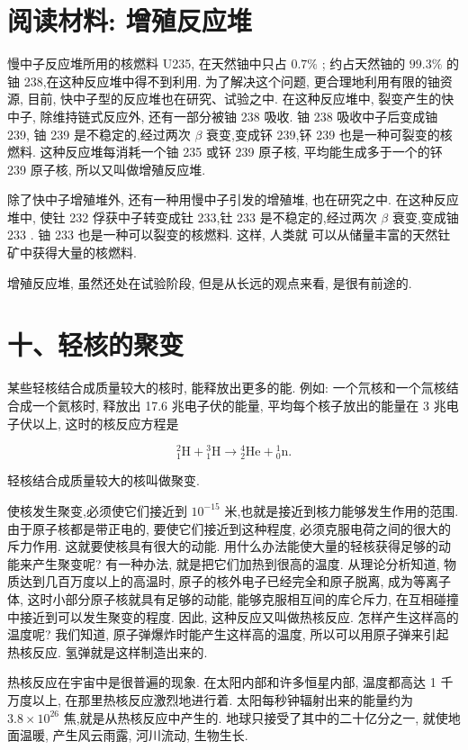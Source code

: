 \documentclass[10pt]{article}
\begin{document}
\section*{阅读材料: 增殖反应堆}

慢中子反应堆所用的核燃料 U235, 在天然铀中只占 \({0.7}\%\) ; 约占天然铀的 \({99.3}\%\) 的铀 238,在这种反应堆中得不到利用. 为了解决这个问题, 更合理地利用有限的铀资源, 目前, 快中子型的反应堆也在研究、试验之中. 在这种反应堆中, 裂变产生的快中子, 除维持链式反应外, 还有一部分被铀 238 吸收. 铀 238 吸收中子后变成铀 239, 铀 239 是不稳定的,经过两次 \(\beta\) 衰变,变成钚 239,钚 239 也是一种可裂变的核燃料. 这种反应堆每消耗一个铀 235 或钚 239 原子核, 平均能生成多于一个的钚 239 原子核, 所以又叫做增殖反应堆.

除了快中子增殖堆外, 还有一种用慢中子引发的增殖堆, 也在研究之中. 在这种反应堆中, 使钍 232 俘获中子转变成钍 233,钍 233 是不稳定的,经过两次 \(\beta\) 衰变,变成铀 233 . 铀 233 也是一种可以裂变的核燃料. 这样, 人类就 可以从储量丰富的天然钍矿中获得大量的核燃料.

增殖反应堆, 虽然还处在试验阶段, 但是从长远的观点来看, 是很有前途的.

\section*{十、轻核的聚变}

某些轻核结合成质量较大的核时, 能释放出更多的能. 例如: 一个氘核和一个氚核结合成一个氦核时, 释放出 17.6 兆电子伏的能量, 平均每个核子放出的能量在 3 兆电子伏以上, 这时的核反应方程是

\[
{}_{1}^{2}\mathrm{H} + {}_{1}^{3}\mathrm{H} \rightarrow {}_{2}^{4}\mathrm{{He}} + {}_{0}^{1}\mathrm{n}.
\]

轻核结合成质量较大的核叫做聚变.

使核发生聚变,必须使它们接近到 \({10}^{-{15}}\) 米,也就是接近到核力能够发生作用的范围. 由于原子核都是带正电的, 要使它们接近到这种程度, 必须克服电荷之间的很大的斥力作用. 这就要使核具有很大的动能. 用什么办法能使大量的轻核获得足够的动能来产生聚变呢? 有一种办法, 就是把它们加热到很高的温度. 从理论分析知道, 物质达到几百万度以上的高温时, 原子的核外电子已经完全和原子脱离, 成为等离子体, 这时小部分原子核就具有足够的动能, 能够克服相互间的库仑斥力, 在互相碰撞中接近到可以发生聚变的程度. 因此, 这种反应又叫做热核反应. 怎样产生这样高的温度呢? 我们知道, 原子弹爆炸时能产生这样高的温度, 所以可以用原子弹来引起热核反应. 氢弹就是这样制造出来的.

热核反应在宇宙中是很普遍的现象. 在太阳内部和许多恒星内部, 温度都高达 1 千万度以上, 在那里热核反应激烈地进行着. 太阳每秒钟辐射出来的能量约为 \({3.8} \times {10}^{26}\) 焦,就是从热核反应中产生的. 地球只接受了其中的二十亿分之一, 就使地面温暖, 产生风云雨露, 河川流动, 生物生长.
\end{document}
